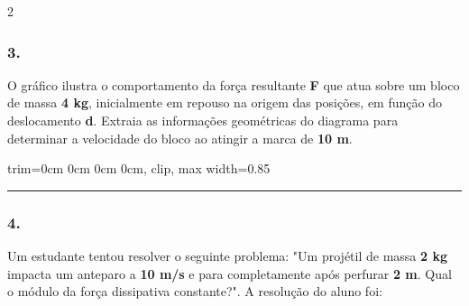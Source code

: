 \documentclass[twoside, 10pt, a4paper]{article}
\newlength{\espacoPreQuestao}\setlength{\espacoPreQuestao}{0.1cm}
\newlength{\espacoQuestao}\setlength{\espacoQuestao}{0.2cm}
\newcommand{\larguraTikz}{0.85\linewidth}
\begin{document}
\begin{multicols*}{2}
\subsubsection*{3.} O gráfico ilustra o comportamento da força resultante \textbf{F} que atua sobre um bloco de massa \textbf{4 kg}, inicialmente em repouso na origem das posições, em função do deslocamento \textbf{d}. Extraia as informações geométricas do diagrama para determinar a velocidade do bloco ao atingir a marca de \textbf{10 m}.
\begin{center}
\begin{adjustbox}{trim=0cm 0cm 0cm 0cm, clip, max width=\larguraTikz}
\end{adjustbox}
\end{center}
\par\vspace{\espacoQuestao}

\noindent\textcolor{CorLinha}{\rule{\linewidth}{0.5pt}}
\par\vspace{\espacoPreQuestao}
\subsubsection*{4.} Um estudante tentou resolver o seguinte problema: "Um projétil de massa \textbf{2 kg} impacta um anteparo a \textbf{10 m/s} e para completamente após perfurar \textbf{2 m}. Qual o módulo da força dissipativa constante?". A resolução do aluno foi:


\end{multicols*}
\end{document}
